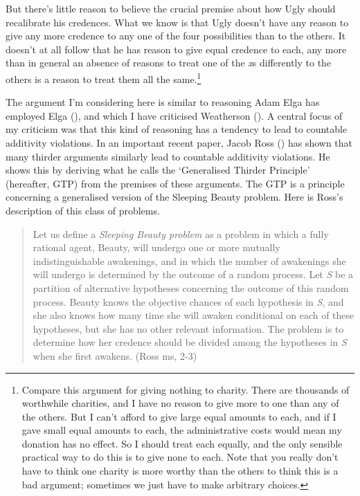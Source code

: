 \documentclass[
  10pt,
  letterpaper,
  DIV=11,
  numbers=noendperiod,
  twoside]{scrartcl}
\begin{document}
But there's little reason to believe the crucial premise about how Ugly
should recalibrate his credences. What we know is that Ugly doesn't have
any reason to give any more credence to any one of the four
possibilities than to the others. It doesn't at all follow that he has
reason to give equal credence to each, any more than in general an
absence of reasons to treat one of the \emph{x}s differently to the
others is a reason to treat them all the same.\footnote{Compare this
  argument for giving nothing to charity. There are thousands of
  worthwhile charities, and I have no reason to give more to one than
  any of the others. But I can't afford to give large equal amounts to
  each, and if I gave small equal amounts to each, the administrative
  costs would mean my donation has no effect. So I should treat each
  equally, and the only sensible practical way to do this is to give
  none to each. Note that you really don't have to think one charity is
  more worthy than the others to think this is a bad argument; sometimes
  we just have to make arbitrary choices.}

The argument I'm considering here is similar to reasoning Adam Elga has
employed Elga (), and which I have
criticised Weatherson (). A
central focus of my criticism was that this kind of reasoning has a
tendency to lead to countable additivity violations. In an important
recent paper, Jacob Ross () has shown that
many thirder arguments similarly lead to countable additivity
violations. He shows this by deriving what he calls the `Generalised
Thirder Principle' (hereafter, GTP) from the premises of these
arguments. The GTP is a principle concerning a generalised version of
the Sleeping Beauty problem. Here is Ross's description of this class of
problems.

\begin{quote}
Let us define a \emph{Sleeping Beauty problem} as a problem in which a
fully rational agent, Beauty, will undergo one or more mutually
indistinguishable awakenings, and in which the number of awakenings she
will undergo is determined by the outcome of a random process. Let
\emph{S} be a partition of alternative hypotheses concerning the outcome
of this random process. Beauty knows the objective chances of each
hypothesis in \emph{S}, and she also knows how many time she will awaken
conditional on each of these hypotheses, but she has no other relevant
information. The problem is to determine how her credence should be
divided among the hypotheses in \emph{S} when she first awakens. (Ross
ms, 2-3)
\end{quote}
\end{document}
